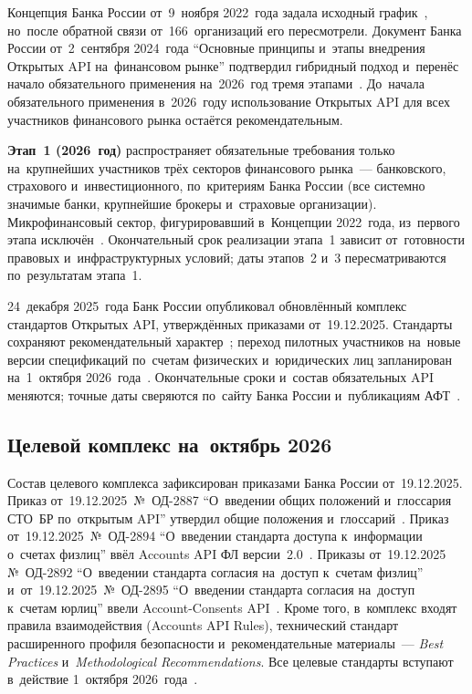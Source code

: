 Концепция Банка России от~9~ноября 2022~года задала исходный
график~\cite{cbr-open-api-concept}, но~после обратной связи
от~166~организаций его пересмотрели. Документ Банка России от~2~сентября
2024~года \enquote{Основные принципы и~этапы внедрения Открытых API
на~финансовом рынке} подтвердил гибридный подход и~перенёс начало обязательного
применения на~2026~год тремя этапами~\cite{cbr-open-api-stages-2024}.
До~начала обязательного применения в~2026~году использование Открытых API для
всех участников финансового рынка остаётся рекомендательным.

\textbf{Этап~1 (2026~год)} распространяет обязательные требования только
на~крупнейших участников трёх секторов финансового рынка~--- банковского,
страхового и~инвестиционного, по~критериям Банка России (все системно значимые
банки, крупнейшие брокеры и~страховые организации). Микрофинансовый сектор,
фигурировавший в~Концепции 2022~года, из~первого этапа
исключён~\cite{cbr-open-api-stages-2024}. Окончательный срок реализации этапа~1
зависит от~готовности правовых и~инфраструктурных условий; даты этапов~2 и~3
пересматриваются по~результатам этапа~1.

24~декабря 2025~года Банк России опубликовал обновлённый комплекс стандартов
Открытых API, утверждённых приказами от~19.12.2025.
Стандарты сохраняют рекомендательный характер~\cite{cbr-open-api-update-2025};
переход пилотных участников на~новые версии спецификаций по~счетам физических
и~юридических лиц запланирован на~1~октября
2026~года~\cite{aft-open-api-standards-2025}. Окончательные сроки
и~состав обязательных API меняются; точные даты сверяются по~сайту Банка России
и~публикациям АФТ~\cite{cbr-open-api,afe-open-api,openbankingrussia-wiki}.

\subsection*{Целевой комплекс на~октябрь 2026}

Состав целевого комплекса зафиксирован приказами Банка России от~19.12.2025.
Приказ от~19.12.2025~№~ОД-2887 \enquote{О~введении общих положений
и~глоссария СТО~БР по~открытым API} утвердил общие положения
и~глоссарий~\cite{cbr-od-2887}. Приказ от~19.12.2025~№~ОД-2894
\enquote{О~введении стандарта доступа к~информации о~счетах физлиц} ввёл
Accounts API ФЛ версии~2.0~\cite{cbr-od-2894}. Приказы от~19.12.2025
№~ОД-2892 \enquote{О~введении стандарта согласия на~доступ к~счетам физлиц}
и~от~19.12.2025~№~ОД-2895 \enquote{О~введении стандарта согласия на~доступ
к~счетам юрлиц} ввели Account-Consents API~\cite{cbr-od-2892,cbr-od-2895}.
Кроме того, в~комплекс входят правила взаимодействия (Accounts API Rules),
технический стандарт расширенного профиля безопасности и~рекомендательные
материалы~--- \textit{Best Practices} и~\textit{Methodological Recommendations}.
Все целевые стандарты вступают в~действие 1~октября
2026~года~\cite{openbankingrussia-wiki}.


